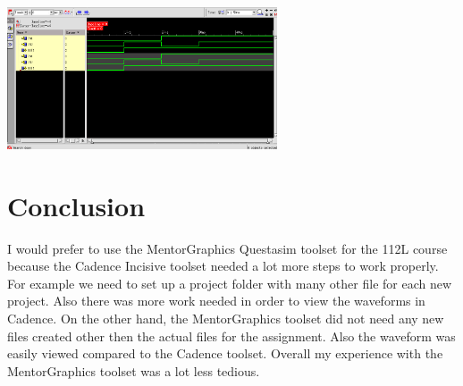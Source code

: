 \documentclass{article}
\begin{document}
	\includegraphics[width=0.6\textwidth]{Cadence_waveform.png}

\section{Conclusion}

	I would prefer to use the MentorGraphics Questasim toolset for the 112L course because the Cadence Incisive toolset needed a lot more steps to work properly. For example we need to set up a project folder with many other file for each new project. Also there was more work needed in order to view the waveforms in Cadence. On the other hand, the MentorGraphics toolset did not need any new files created other then the actual files for the assignment. Also the waveform was easily viewed compared to the Cadence toolset. Overall my experience with the MentorGraphics toolset was a lot less tedious.  
\end{document}
